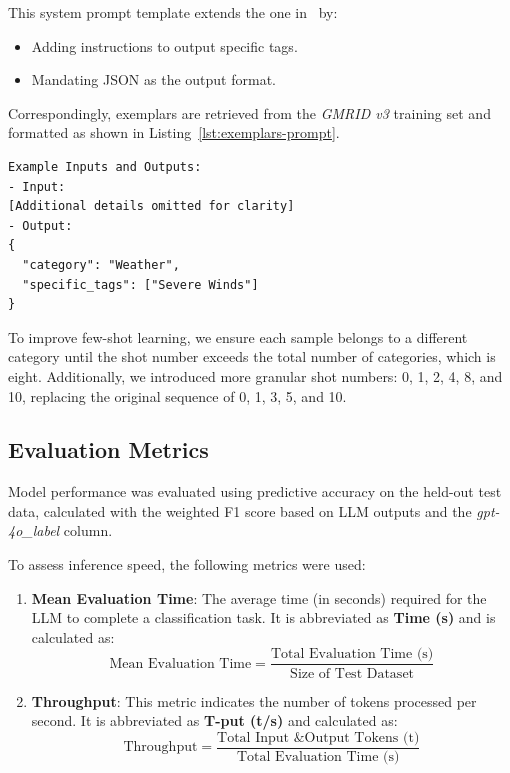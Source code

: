 \documentclass[conference]{IEEEtran}
\begin{document}
This system prompt template extends the one in~\cite{huang2024automating} by:
\begin{itemize}
    \item Adding instructions to output specific tags.
    \item Mandating JSON as the output format.
\end{itemize}
Correspondingly, exemplars are retrieved from the \textit{GMRID v3} training set and formatted as shown in Listing~\ref{lst:exemplars-prompt}.

\begin{lstlisting}[caption={Exemplars Used in Few-Shot Prompting}, 
                   label={lst:exemplars-prompt}, 
                   breaklines=true, 
                   basicstyle=\scriptsize\ttfamily, 
                   xleftmargin=0pt, 
                   framexleftmargin=0pt, 
                   framesep=0pt, 
                   aboveskip=0pt, 
                   belowskip=0pt, 
                   showspaces=false, 
                   showstringspaces=false,
                   keepspaces=true,
                   breakindent=0pt]
Example Inputs and Outputs:
- Input:
[Additional details omitted for clarity]
- Output:
{
  "category": "Weather",
  "specific_tags": ["Severe Winds"]
}
\end{lstlisting}

To improve few-shot learning, we ensure each sample belongs to a different category until the shot number exceeds the total number of categories, which is eight. Additionally, we introduced more granular shot numbers: 0, 1, 2, 4, 8, and 10, replacing the original sequence of 0, 1, 3, 5, and 10.

\subsection{Evaluation Metrics}

Model performance was evaluated using predictive accuracy on the held-out test data, calculated with the weighted F1 score based on LLM outputs and the \textit{gpt-4o\_label} column.

To assess inference speed, the following metrics were used:
\begin{enumerate}
    \item \textbf{Mean Evaluation Time}: The average time (in seconds) required for the LLM to complete a classification task. It is abbreviated as \textbf{Time (s)} and is calculated as:
    \[
    \text{Mean Evaluation Time} = \frac{\text{Total Evaluation Time (s)}}{\text{Size of Test Dataset}}
    \]

    \item \textbf{Throughput}: This metric indicates the number of tokens processed per second. It is abbreviated as \textbf{T-put (t/s)} and calculated as:
    \[
    \text{Throughput} = \frac{\text{Total Input \& Output Tokens (t)}}{\text{Total Evaluation Time (s)}}
    \]
\end{enumerate}
\end{document}
